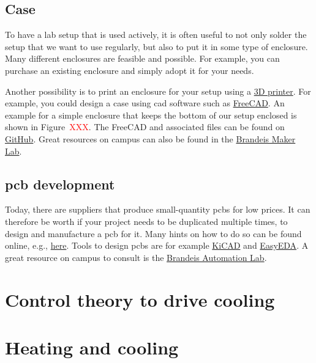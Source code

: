 \subsection{Case}

To have a lab setup that is used actively, it is often useful to not only solder the setup that we want to use regularly, but also to put it in some type of enclosure. Many different enclosures are feasible and possible. For example, you can purchase an existing enclosure and simply adopt it for your needs. 

Another possibility is to print an enclosure for your setup using a \href{https://en.wikipedia.org/wiki/3D_printing}{3D printer}. For example, you could design a case using \ac{cad} software such as \href{https://www.freecad.org/}{FreeCAD}. An example for a simple enclosure that keeps the bottom of our setup enclosed is shown in Figure~\textcolor{red}{XXX}. The FreeCAD and associated files can be found on \href{https://github.com/galactic-forensics/workshop_arduino_electronics/tree/main/3d_files}{GitHub}. Great resources on campus can also be found in the \href{https://www.brandeis.edu/library/research-technology-innovation/makerlab.html}{Brandeis Maker Lab}.


\subsection{\Ac{pcb} development}

Today, there are suppliers that produce small-quantity \acp{pcb} for low prices. It can therefore be worth if your project needs to be duplicated multiple times, to design and manufacture a \ac{pcb} for it. Many hints on how to do so can be found online, e.g., \href{https://maker.pro/arduino/projects/7-tips-for-beginners-about-how-to-design-a-pcb-1}{here}. Tools to design \acp{pcb} are for example \href{https://www.kicad.org/}{KiCAD} and \href{https://easyeda.com/}{EasyEDA}. A great resource on campus to consult is the \href{https://www.brandeis.edu/library/research-technology-innovation/automation.html}{Brandeis Automation Lab}.


\section{Control theory to drive cooling}

\section{Heating and cooling}

